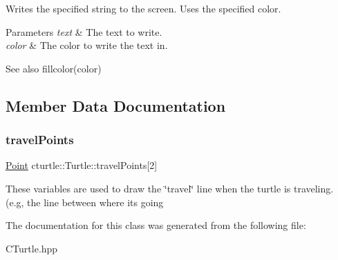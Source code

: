 Writes the specified string to the screen. Uses the specified color. 
\begin{DoxyParams}{Parameters}
{\em text} & The text to write. \\
\hline
{\em color} & The color to write the text in. \\
\hline
\end{DoxyParams}
\begin{DoxySeeAlso}{See also}
fillcolor(color) 
\end{DoxySeeAlso}


\subsection{Member Data Documentation}
\mbox{\label{classcturtle_1_1Turtle_ab7156951a007fbbc8a07cbb66e7b888b}} 
\subsubsection{\texorpdfstring{travel\+Points}{travelPoints}}
{\footnotesize\ttfamily \hyperlink{structcturtle_1_1ivec2}{Point} cturtle\+::\+Turtle\+::travel\+Points\mbox{[}2\mbox{]}\hspace{0.3cm}{\ttfamily [protected]}}

These variables are used to draw the \char`\"{}travel\char`\"{} line when the turtle is traveling. (e.\+g, the line between where it\textquotesingle{}s going 

The documentation for this class was generated from the following file\+:\begin{DoxyCompactItemize}
\item 
C\+Turtle.\+hpp\end{DoxyCompactItemize}
